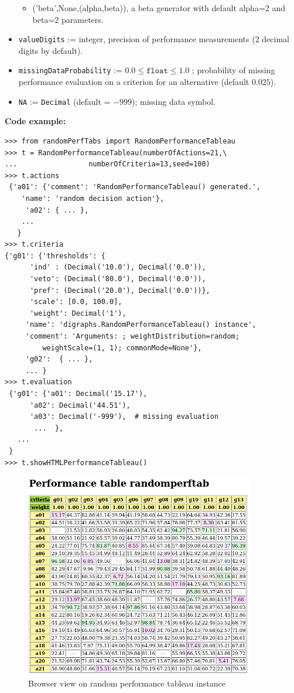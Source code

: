 \begin{itemize}
\begin{itemize}
         \item ('beta',None,(alpha,beta)), a beta generator with default alpha=2 and beta=2 parameters.
      \end{itemize}
\item \texttt{valueDigits} := integer, precision of performance measurements (2 decimal digits by default).
\item \texttt{missingDataProbability} := $0.0 \leq \mathtt{float} \leq 1.0$ ; probability of missing performance evaluation on a criterion for an alternative (default $0.025$).
\item \texttt{NA} := \texttt{Decimal} (default = $-999$); missing data symbol. 
\end{itemize} 

\noindent \textbf{Code example:}

\begin{lstlisting}[caption={Generating a random performance tableau},label=list:5.1,basicstyle=\footnotesize]
>>> from randomPerfTabs import RandomPerformanceTableau
>>> t = RandomPerformanceTableau(numberOfActions=21,\
...                 numberOfCriteria=13,seed=100)
>>> t.actions
 {'a01': {'comment': 'RandomPerformanceTableau() generated.',
	'name': 'random decision action'},
	 'a02': { ... },
    ...
   }
>>> t.criteria
{'g01': {'thresholds': {
      'ind' : (Decimal('10.0'), Decimal('0.0')),
      'veto': (Decimal('80.0'), Decimal('0.0')),
      'pref': (Decimal('20.0'), Decimal('0.0'))},
      'scale': [0.0, 100.0],
      'weight': Decimal('1'),
     'name': 'digraphs.RandomPerformanceTableau() instance',
     'comment': 'Arguments: ; weightDistribution=random;
         weightScale=(1, 1); commonMode=None'},
	 'g02':  { ... },
     ... }
>>> t.evaluation
 {'g01': {'a01': Decimal('15.17'),
      'a02': Decimal('44.51'),
      'a03': Decimal('-999'),  # missing evaluation
       ...  },
   ...
 }
>>> t.showHTMLPerformanceTableau()
 \end{lstlisting}

\begin{figure}[h]
\includegraphics[width=10cm]{Figures/randomPerfTab1.png}
\caption{Browser view on random performance tableau instance}
\label{fig:5.1}       %
\end{figure}

